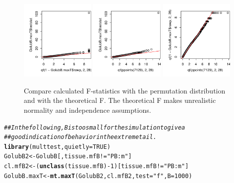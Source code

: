 \documentclass{article}\usepackage[]{graphicx}\usepackage[]{xcolor}
\makeatletter
\newcommand{\hlnum}[1]{\textcolor[rgb]{0.686,0.059,0.569}{#1}}%
\newcommand{\hlstr}[1]{\textcolor[rgb]{0.192,0.494,0.8}{#1}}%
\newcommand{\hlcom}[1]{\textcolor[rgb]{0.678,0.584,0.686}{\textit{#1}}}%
\newcommand{\hlopt}[1]{\textcolor[rgb]{0,0,0}{#1}}%
\newcommand{\hlstd}[1]{\textcolor[rgb]{0.345,0.345,0.345}{#1}}%
\newcommand{\hlkwb}[1]{\textcolor[rgb]{0.69,0.353,0.396}{#1}}%
\newcommand{\hlkwc}[1]{\textcolor[rgb]{0.333,0.667,0.333}{#1}}%
\newcommand{\hlkwd}[1]{\textcolor[rgb]{0.737,0.353,0.396}{\textbf{#1}}}%
\newenvironment{kframe}{%
 \def\at@end@of@kframe{}%
 \ifinner\ifhmode%
  \def\at@end@of@kframe{\end{minipage}}%
  \begin{minipage}{\columnwidth}%
 \fi\fi%
 \def\FrameCommand##1{\hskip\@totalleftmargin \hskip-\fboxsep
 \colorbox{shadecolor}{##1}\hskip-\fboxsep
     \hskip-\linewidth \hskip-\@totalleftmargin \hskip\columnwidth}%
 \MakeFramed {\advance\hsize-\width
   \@totalleftmargin\z@ \linewidth\hsize
   \@setminipage}}%
 {\par\unskip\endMakeFramed%
 \at@end@of@kframe}
\newenvironment{knitrout}{}{} %
\makeatother
\begin{document}
\begin{figure}
\begin{knitrout}
\color{fgcolor}

{\centering \includegraphics[width=0.32\textwidth]{figs/key-plot-Fstats-1} 
\includegraphics[width=0.32\textwidth]{figs/key-plot-Fstats-2} 
\includegraphics[width=0.32\textwidth]{figs/key-plot-Fstats-3} 

}


\end{knitrout}
\caption{Compare calculated F-statistics with the permutation distribution 
and with the theoretical F. The theoretical F makes unrealistic normality 
and independence assumptions.}\label{fig:qq}
\end{figure}

\begin{knitrout}
\color{fgcolor}\begin{kframe}
\begin{alltt}
\hlcom{## In the following, B is too small for the simulation to give a}
\hlcom{## good indication of behavior in the extreme tail.}
\hlkwd{library}\hlstd{(multtest,} \hlkwc{quietly}\hlstd{=}\hlnum{TRUE}\hlstd{)}
\hlstd{GolubB2} \hlkwb{<-} \hlstd{GolubB[,tissue.mfB}\hlopt{!=}\hlstr{"PB:m"}\hlstd{]}
\hlstd{cl.mfB2} \hlkwb{<-}  \hlstd{(}\hlkwd{unclass}\hlstd{(tissue.mfB)}\hlopt{-}\hlnum{1}\hlstd{)[tissue.mfB}\hlopt{!=}\hlstr{"PB:m"}\hlstd{]}
\hlstd{GolubB.maxT} \hlkwb{<-} \hlkwd{mt.maxT}\hlstd{(GolubB2, cl.mfB2,} \hlkwc{test}\hlstd{=}\hlstr{"f"}\hlstd{,} \hlkwc{B}\hlstd{=}\hlnum{1000}\hlstd{)}
\end{alltt}
\end{kframe}
\end{knitrout}
\end{document}
